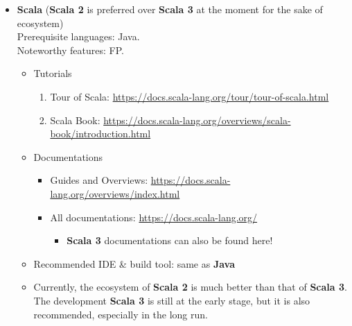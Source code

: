 \documentclass{article}
\begin{document}
\begin{itemize}
    \item \textbf{Scala}
    (\textbf{Scala 2} is preferred over \textbf{Scala 3} at the moment for the sake of ecosystem)\\
    Prerequisite languages: Java.\\
    Noteworthy features: FP.
    \begin{itemize}
        \item Tutorials
        \begin{enumerate}
            \item Tour of Scala:
            \href{https://docs.scala-lang.org/tour/tour-of-scala.html}{https://docs.scala-lang.org/tour/tour-of-scala.html}
            \item Scala Book:
            \href{https://docs.scala-lang.org/overviews/scala-book/introduction.html}{https://docs.scala-lang.org/overviews/scala-book/introduction.html}
        \end{enumerate}
        \item Documentations
        \begin{itemize}
            \item Guides and Overviews:
            \href{https://docs.scala-lang.org/overviews/index.html}{https://docs.scala-lang.org/overviews/index.html}
            \item All documentations:
            \href{https://docs.scala-lang.org/}{https://docs.scala-lang.org/}
                \begin{itemize}
                    \item \textbf{Scala 3} documentations can also be found here!
                \end{itemize}
        \end{itemize}
        \item Recommended IDE \& build tool: same as \textbf{Java}
        \item Currently, the ecosystem of \textbf{Scala 2} is much better than that of \textbf{Scala 3}.
        The development \textbf{Scala 3} is still at the early stage, but it is also recommended, especially in the long run.
        \end{itemize}
        

\end{itemize}
\end{document}
